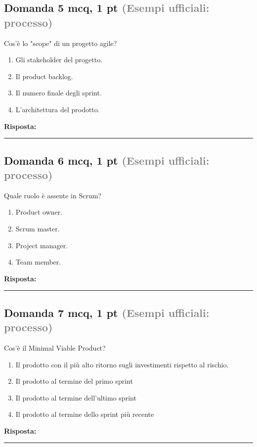 \documentclass[a4paper,11pt]{article}
\begin{document}
\subsection*{Domanda 5 \hfill {\small mcq, 1 pt \textcolor{gray}{(Esempi ufficiali: processo)}}}
Cos'è lo "scope" di un progetto agile?

\begin{enumerate}[label=\alph*)]
\item Gli stakeholder del progetto.
\item Il product backlog.
\item Il numero finale degli sprint.
\item L'architettura del prodotto.
\end{enumerate}
\vspace{0.2cm}
\noindent\textbf{Risposta:}\par
\vspace{1.5cm}\hrule


\subsection*{Domanda 6 \hfill {\small mcq, 1 pt \textcolor{gray}{(Esempi ufficiali: processo)}}}
Quale ruolo è assente in Scrum?

\begin{enumerate}[label=\alph*)]
\item Product owner.
\item Scrum master.
\item Project manager.
\item Team member.
\end{enumerate}
\vspace{0.2cm}
\noindent\textbf{Risposta:}\par
\vspace{1.5cm}\hrule


\subsection*{Domanda 7 \hfill {\small mcq, 1 pt \textcolor{gray}{(Esempi ufficiali: processo)}}}
Cos'è il Minimal Viable Product?

\begin{enumerate}[label=\alph*)]
\item Il prodotto con il più alto ritorno sugli investimenti rispetto al rischio.
\item Il prodotto al termine del primo sprint
\item Il prodotto al termine dell'ultimo sprint
\item Il prodotto al termine dello sprint più recente
\end{enumerate}
\vspace{0.2cm}
\noindent\textbf{Risposta:}\par
\vspace{1.5cm}\hrule
\end{document}
